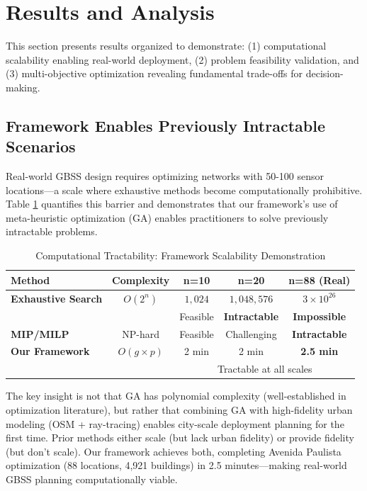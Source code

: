 
\section{Results and Analysis}

This section presents results organized to demonstrate: (1) computational scalability enabling real-world deployment, (2) problem feasibility validation, and (3) multi-objective optimization revealing fundamental trade-offs for decision-making.

\subsection{Framework Enables Previously Intractable Scenarios}

Real-world GBSS design requires optimizing networks with 50-100 sensor locations—a scale where exhaustive methods become computationally prohibitive. Table \ref{tab:scalability} quantifies this barrier and demonstrates that our framework's use of meta-heuristic optimization (GA) enables practitioners to solve previously intractable problems.

\begin{table}[h]
\centering
\caption{Computational Tractability: Framework Scalability Demonstration}
\label{tab:scalability}
\begin{tabular}{lcccc}
\toprule
\textbf{Method} & \textbf{Complexity} & \textbf{n=10} & \textbf{n=20} & \textbf{n=88 (Real)} \\
\midrule
\textbf{Exhaustive Search} & $O(2^n)$ & $1,024$ & $1,048,576$ & $3 \times 10^{26}$ \\
 & & Feasible & \textbf{Intractable} & \textbf{Impossible} \\
\midrule
\textbf{MIP/MILP} & NP-hard & Feasible & Challenging & \textbf{Intractable} \\
\midrule
\textbf{Our Framework} & $O(g \times p)$ & 2 min & 2 min & \textbf{2.5 min} \\
 & & \multicolumn{3}{c}{Tractable at all scales} \\
\bottomrule
\end{tabular}
\end{table}

The key insight is not that GA has polynomial complexity (well-established in optimization literature), but rather that combining GA with high-fidelity urban modeling (OSM + ray-tracing) enables city-scale deployment planning for the first time. Prior methods either scale (but lack urban fidelity) or provide fidelity (but don't scale). Our framework achieves both, completing Avenida Paulista optimization (88 locations, 4,921 buildings) in 2.5 minutes—making real-world GBSS planning computationally viable.

